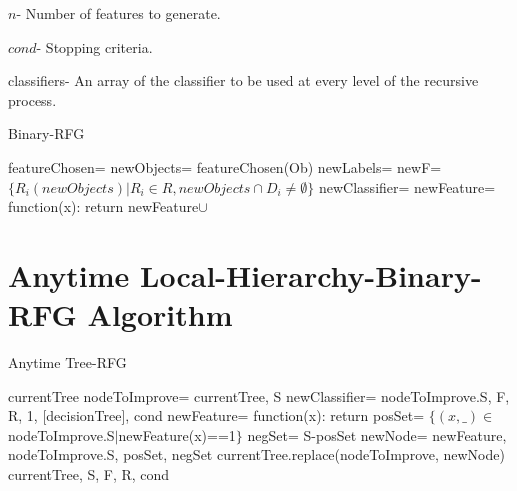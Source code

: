 \documentclass[12pt, a4paper]{article}
\theoremstyle{definition}
\begin{document}
\begin{appendices}
\begin{algorithm}[H]
$n$- Number of features to generate.

$cond$- Stopping criteria.

classifiers- An array of the classifier to be used at every level of the recursive process.

\caption{Binary-RFG}
\label{code2}
\begin{algorithmic}
    \State
    \Return {}
\EndIf
\State featureChosen= 
\State newObjects= featureChosen(Ob)
\State newLabels= 
\State newF= $\{R_{i}(newObjects)|R_{i}\in R, newObjects\cap D_{i}\neq\emptyset\}$
\State newClassifier= 
\State newFeature= function(x): return 
\State
\Return newFeature$\cup$ 
\EndFunction

\end{algorithmic}
\end{algorithm}

\section{Anytime Local-Hierarchy-Binary-RFG Algorithm} \label{app:3}
\begin{algorithm}[H]
\caption{Anytime Tree-RFG}
\label{code3}
\begin{algorithmic}
    \State
    \Return currentTree
\EndIf
\State nodeToImprove=  {currentTree, S}
\State newClassifier=  {nodeToImprove.S, F, R, 1, [decisionTree], cond}
\State newFeature= function(x): return 
\State posSet= $\{(x,\_)\in$ nodeToImprove.S$|$newFeature(x)==1$\}$
\State negSet= S-posSet
\State newNode=  {newFeature, nodeToImprove.S, posSet, negSet}
\State currentTree.replace(nodeToImprove, newNode)
\State
\Return {} {currentTree, S, F, R, cond}
\EndFunction

\end{algorithmic}
\end{algorithm}
\end{appendices}
\end{document}
